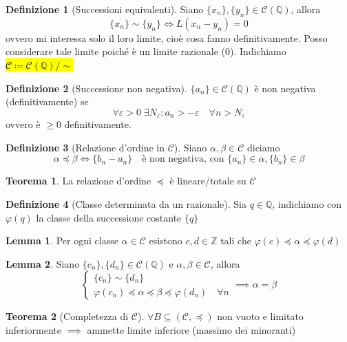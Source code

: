 \documentclass[a4paper,10pt]{article}
\theoremstyle{definition}
\newcommand{\za}{\mathbb{Z}} %
\newcommand{\qu}{\mathbb{Q}} %
\theoremstyle{indentdefinition}
\newtheorem{defn}{Definizione}[section]
\theoremstyle{indentpostulate}
\theoremstyle{indenttheorem}
\newtheorem{thm}{Teorema}[section]
\newtheorem{lem*}{Lemma}[section]
\theoremstyle{myremark}
\theoremstyle{indentgeneral}
\newenvironment{myboxed} 
{\noindent\begin{lrbox}{\mybox}\begin{minipage}{\textwidth}}
{\end{minipage}\end{lrbox}\fbox{\usebox{\mybox}}}
\begin{document}
\begin{defn}[Successioni equivalenti]
    Siano $\{x_n\},\{y_n\}\in\mathscr{C}(\qu)$, allora
    $$\{x_n\}\sim \{y_n\}\iff L(x_n-y_n)=0$$
    ovvero mi interessa solo il loro limite, cioè cosa fanno definitivamente. Posso considerare tale limite poiché è un limite razionale (0). Indichiamo \hl{$\mathscr{C}\coloneqq \mathscr{C}(\qu)/\sim$}
\end{defn}

\begin{defn}[Successione non negativa]
    $\{a_n\}\in\mathscr{C}(\qu)$ è non negativa (definitivamente) se 
    $$\forall\varepsilon>0\;\exists N_\varepsilon: a_n>-\varepsilon \quad \forall n>N_\varepsilon$$
    ovvero è $\ge 0$ definitivamente.
\end{defn}


\begin{defn}[Relazione d'ordine in $\mathscr{C}$]
    Siano $\alpha,\beta\in\mathscr{C}$ diciamo
    $$\alpha\preceq \beta \iff \{b_n-a_n\} \quad\text{è non negativa, con }\{a_n\}\in\alpha,\{b_n\}\in\beta$$
\end{defn}

\begin{thm}
    La relazione d'ordine $\preceq$ è lineare/totale su $\mathscr{C}$
\end{thm}
\begin{defn}[Classe determinata da un razionale] Sia $q\in\qu$, indichiamo con $\varphi(q)$ la classe della successione costante $\{q\}$
\end{defn}

\begin{lem*}\label{lem-primoLemma}
    Per ogni classe $\alpha\in\mathscr{C}$ esistono $c,d\in\za$ tali che $\varphi(c)\preceq \alpha\preceq\varphi(d)$
\end{lem*}

\begin{lem*}\label{lem-secondoLemma} Siano $\{c_n\},\{d_n\}\in\mathscr{C}(\qu)$ e $\alpha,\beta\in\mathscr{C}$, allora  
    $$\begin{cases}
        \{c_n\}\sim \{d_n\} \\
        \varphi(c_n)\preceq\alpha\preceq\beta\preceq\varphi(d_n)\quad \forall n
    \end{cases}\implies \alpha=\beta$$
\end{lem*}

\begin{myboxed}
    \begin{thm}[Completezza di $\mathscr{C}$]
         $\forall B\subseteq(\mathscr{C},\preceq)$ non vuoto e limitato inferiormente $\implies$ ammette limite inferiore (massimo dei minoranti)
    \end{thm}
\end{myboxed}
\end{document}
